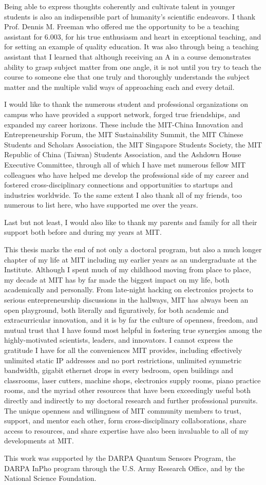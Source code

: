 Being able to express thoughts coherently and cultivate talent in younger students is also an indispensible part of humanity's scientific endeavors. I thank Prof. Dennis M. Freeman who offered me the opportunity to be a teaching assistant for 6.003, for his true enthusiasm and heart in exceptional teaching, and for setting an example of quality education. It was also through being a teaching assistant that I learned that although receiving an A in a course demonstrates ability to grasp subject matter from one angle, it is not until you try to teach the course to someone else that one truly and thoroughly understands the subject matter and the multiple valid ways of approaching each and every detail.

I would like to thank the numerous student and professional organizations on campus who have provided a support network, forged true friendships, and expanded my career horizons. These include the MIT-China Innovation and Entrepreneurship Forum, the MIT Sustainability Summit, the MIT Chinese Students and Scholars Association, the MIT Singapore Students Society, the MIT Republic of China (Taiwan) Students Association, and the Ashdown House Executive Committee, through all of which I have met numerous fellow MIT colleagues who have helped me develop the professional side of my career and fostered cross-disciplinary connections and opportunities to startups and industries worldwide. To the same extent I also thank all of my friends, too numerous to list here, who have supported me over the years.

Last but not least, I would also like to thank my parents and family for all their support both before and during my years at MIT.

This thesis marks the end of not only a doctoral program, but also a much longer chapter of my life at MIT including my earlier years as an undergraduate at the Institute. Although I spent much of my childhood moving from place to place, my decade at MIT has by far made the biggest impact on my life, both academically and personally. From late-night hacking on electronics projects to serious entrepreneurship discussions in the hallways, MIT has always been an open playground, both literally and figuratively, for both academic and extracurricular innovation, and it is by far the culture of openness, freedom, and mutual trust that I have found most helpful in fostering true synergies among the highly-motivated scientists, leaders, and innovators. I cannot express the gratitude I have for all the conveniences MIT provides, including effectively unlimited static IP addresses and no port restrictions, unlimited symmetric bandwidth, gigabit ethernet drops in every bedroom, open buildings and classrooms, laser cutters, machine shops, electronics supply rooms, piano practice rooms, and the myriad other resources that have been exceedingly useful both directly and indirectly to my doctoral research and further professional pursuits. The unique openness and willingness of MIT community members to trust, support, and mentor each other, form cross-disciplinary collaborations, share access to resources, and share expertise have also been invaluable to all of my developments at MIT.

This work was supported by the DARPA Quantum Sensors Program, the DARPA InPho program through the U.S. Army Research Office, and by the National Science Foundation.
